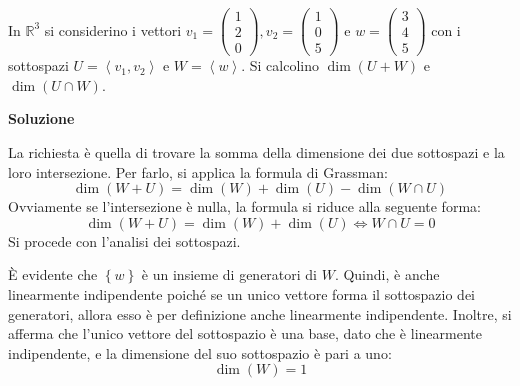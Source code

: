 \documentclass[a4paper]{article}
\begin{document}
	\noindent
	In $\mathbb{R}^{3}$ si considerino i vettori $v_{1} = \begin{pmatrix}
		1 \\
		2 \\
		0
	\end{pmatrix}, v_{2} = \begin{pmatrix}
		1 \\
		0 \\
		5
	\end{pmatrix}$ e $w = \begin{pmatrix}
		3 \\
		4 \\
		5
	\end{pmatrix}$ con i sottospazi $U = \left\langle v_{1}, v_{2} \right\rangle$ e $W = \left\langle w \right\rangle$. Si calcolino $\dim\left(U+W\right)$ e $\dim\left(U \cap W\right)$.\newline

	\noindent
	\textcolor{Green4}{\textbf{Soluzione}}\newline
	
	\noindent
	La richiesta è quella di trovare la somma della dimensione dei due sottospazi e la loro intersezione. Per farlo, si applica la formula di Grassman:
	\begin{equation*}
		\dim\left(W + U\right) = \dim\left(W\right) + \dim\left(U\right) - \dim\left(W \cap U\right)
	\end{equation*}
	Ovviamente se l'intersezione è nulla, la formula si riduce alla seguente forma:
	\begin{equation*}
		\dim\left(W + U\right) = \dim\left(W\right) + \dim\left(U\right) \iff W \cap U = {0}
	\end{equation*}
	Si procede con l'analisi dei sottospazi.\newline
	
	\noindent
	È evidente che $\left\{w\right\}$ è un insieme di generatori di $W$. Quindi, è anche linearmente indipendente poiché se un unico vettore forma il sottospazio dei generatori, allora esso è per definizione anche linearmente indipendente. Inoltre, si afferma che l'unico vettore del sottospazio è una base, dato che è linearmente indipendente, e la dimensione del suo sottospazio è pari a uno:
	\begin{equation*}
		\dim\left(W\right) = 1
	\end{equation*}\newline
	
\end{document}
